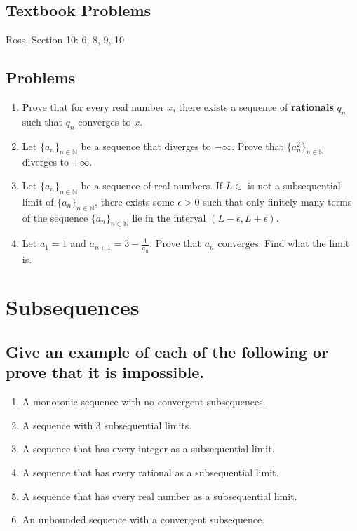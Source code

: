 \documentclass{article}
\theoremstyle{definition}
\begin{document}
\subsection{Textbook Problems}

Ross, Section 10: 6, 8, 9, 10

\subsection{Problems}

\begin{enumerate}
    \item Prove that for every real number $x$, there exists a sequence of \textbf{rationals} $q_{n}$ such that $q_{n}$ converges to $x$.
    \item Let \( \{a_n\}_{n \in \mathbb{N}} \) be a sequence that diverges to $- \infty$. Prove that \( \{a_n^{2}\}_{n \in \mathbb{N}} \) diverges to $+ \infty$.

    \item Let \( \{a_n\}_{n \in \mathbb{N}} \) be a sequence of real numbers. If $L \in $ is not a subsequential limit of \( \{a_n\}_{n \in \mathbb{N}} \), there exists some $\epsilon > 0$ such that only finitely many terms of the sequence \( \{a_n\}_{n \in \mathbb{N}} \) lie in the interval $(L - \epsilon, L + \epsilon)$.

    \item Let $a_{1} = 1$ and $a_{n+1} = 3 - \frac{1}{a_{n}}$. Prove that $a_{n}$ converges. Find what the limit is.
\end{enumerate}

\newpage

\section{Subsequences}

\subsection{Give an example of each of the following or prove that it is impossible.}

\begin{enumerate}
    \item A monotonic sequence with no convergent subsequences.
    \item A sequence with 3 subsequential limits.
    \item A sequence that has every integer as a subsequential limit.
    \item A sequence that has every rational as a subsequential limit.
    \item A sequence that has every real number as a subsequential limit.
    \item An unbounded sequence with a convergent subsequence.
\end{enumerate}
\end{document}
